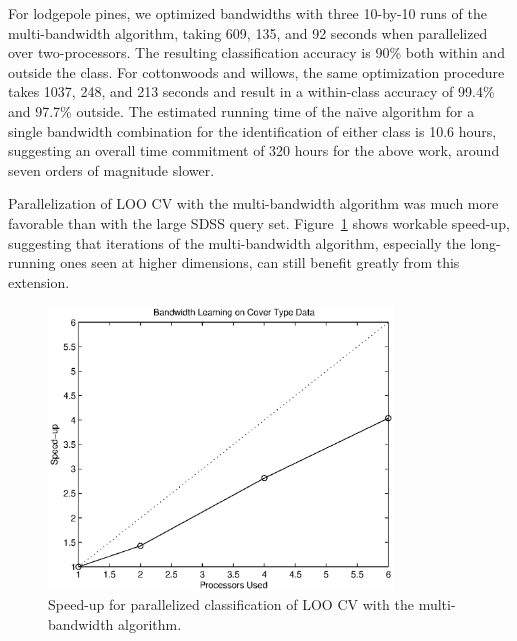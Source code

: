 \documentclass[twoside,leqno,twocolumn]{article}
\begin{document}
For lodgepole pines, we optimized bandwidths with three 10-by-10 runs
of the multi-bandwidth algorithm, taking 609, 135, and 92 seconds when
parallelized over two-processors.  The resulting classification
accuracy is 90\% both within and outside the class.  For cottonwoods
and willows, the same optimization procedure takes 1037, 248, and 213
seconds and result in a within-class accuracy of 99.4\% and 97.7\%
outside.  The estimated running time of the na\"{\i}ve algorithm for a
single bandwidth combination for the identification of either class is
10.6 hours, suggesting an overall time commitment of 320 hours for the
above work, around seven orders of magnitude slower.

Parallelization of LOO CV with the multi-bandwidth algorithm was much
more favorable than with the large SDSS query set.
Figure~\ref{fig:good-para-speedup} shows workable speed-up, suggesting
that iterations of the multi-bandwidth algorithm, especially the
long-running ones seen at higher dimensions, can still benefit greatly
from this extension.

\begin{figure}
  \begin{center}
    \hspace*{-.3in}
    \includegraphics[width=3.6in]{covtype_speedup.eps}
    \hspace*{-.3in}
  \end{center}
  \vspace{-15pt}
  \caption{\label{fig:good-para-speedup}\footnotesize Speed-up for
    parallelized classification of LOO CV with the multi-bandwidth
    algorithm.}
\end{figure}

\end{document}
